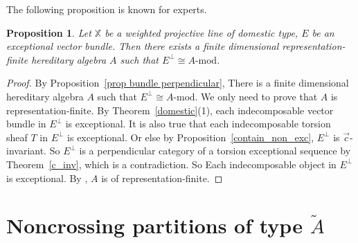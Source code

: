 \documentclass[a4paper, 11pt, reqno]{amsart}
\numberwithin{equation}{section}
\newtheorem{prop}[thm]{Proposition}
\theoremstyle{remark}
\theoremstyle{definition}
\begin{document}
The following proposition is known for experts.

\begin{prop} \label{prop domestic rep-finite}
   Let $\mathbb X$ be a weighted projective line of domestic type, $E$ be an exceptional vector bundle. Then there exists a finite dimensional representation-finite hereditary algebra $A$ such that $E^{\perp} \cong A \text{-} \mathrm{mod}$.
\end{prop}

\begin{proof}
   By Proposition~\ref{prop bundle perpendicular}, There is a finite dimensional hereditary algebra $A$ such that $E^{\perp} \cong A \text{-} \mathrm{mod}$. We only need to prove that $A$ is representation-finite. By Theorem~\ref{domestic}(1), each indecomposable vector bundle in $E^{\perp}$ is exceptional. It is also true that each indecomposable torsion sheaf $T$ in $E^{\perp}$ is exceptional. Or else %
   by Proposition~\ref{contain_non_exc}, $E^{\perp}$ is $\vec c$-invariant. So $E^{\perp}$ is a perpendicular category of a torsion exceptional sequence by Theorem~\ref{c_inv}, which is a contradiction. So Each indecomposable object in $E^{\perp}$ is exceptional. By \cite[Theorem~4.9]{hubery2016categorification}, $A$ is of representation-finite.
\end{proof}










\section{Noncrossing partitions of type $\tilde{A}$}
\end{document}
